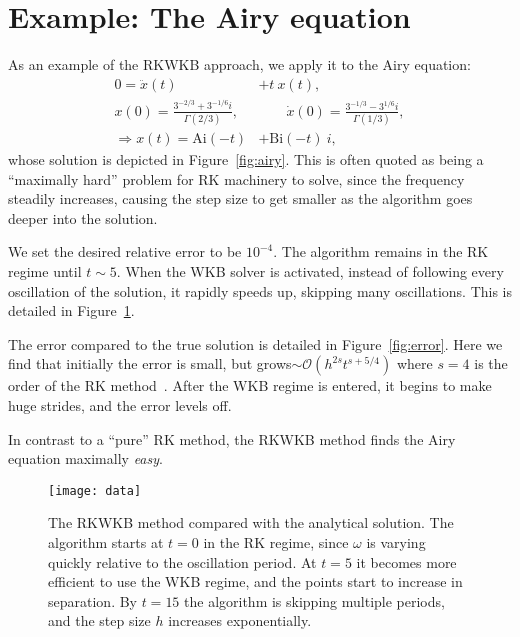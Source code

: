 \section{Example: The Airy equation}


As an example of the RKWKB approach, we apply it to the Airy equation:
\begin{align}
  0=\ddot{x}(t) &+ t\: x(t) ,
  \label{eqn:airy_equation}\\
  x(0)=\frac{3^{-2/3}+3^{-1/6}i}{\Gamma(2/3)},
  &\qquad
  \dot{x}(0) = \frac{3^{-1/3}-3^{1/6}i}{\Gamma(1/3)},
  \nonumber\\
  \Rightarrow x(t) = \mathrm{Ai}(-t) &+ \mathrm{Bi}(-t)\:i,
  \label{eqn:airy_solution}
\end{align}
whose solution is depicted in Figure~\ref{fig:airy}. This is often quoted as being a ``maximally hard'' problem for RK machinery to solve, since the frequency steadily increases, causing the step size to get smaller as the algorithm goes deeper into the solution.

We set the desired relative error to be $10^{-4}$. The algorithm remains in the RK regime until $t\sim5$. When the WKB solver is activated, instead of following every oscillation of the solution, it rapidly speeds up, skipping many oscillations. This is detailed in Figure~\ref{fig:data}.

The error compared to the true solution is detailed in Figure~\ref{fig:error}. Here we find that initially the error is small, but grows$\sim\mathcal{O}(h^{2s} t^{s+5/4})$ where $s=4$ is the order of the RK method~\citep{Iserles02globalerror}. After the WKB regime is entered, it begins to make huge strides, and the error levels off.

In contrast to a ``pure'' RK method, the RKWKB method finds the Airy equation maximally {\em easy}.



\begin{figure}[]
  \centering
  \texttt{[image: data]}
  \caption{The RKWKB method compared with the analytical solution. The algorithm starts at $t=0$ in the RK regime, since $\omega$ is varying quickly relative to the oscillation period. At $t=5$ it becomes more efficient to use the WKB regime, and the points start to increase in separation. By $t=15$ the algorithm is skipping multiple periods, and the step size $h$ increases exponentially.\label{fig:data}}
\end{figure}

